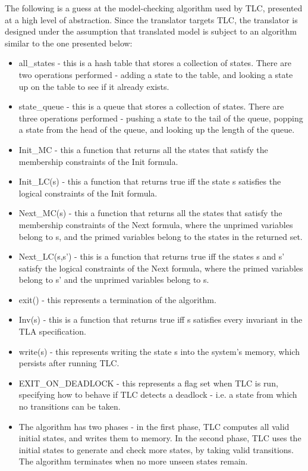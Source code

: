 

The following is a guess at the model-checking algorithm used by TLC, presented at a high level of abstraction. Since the translator targets TLC, the translator is designed under the assumption that translated model is subject to an algorithm similar to the one presented below:

\begin{itemize}
  \item all\_states - this is a hash table that stores a collection of states. There are two operations performed - adding a state to the table, and looking a state up on the table to see if it already exists.
  \item state\_queue - this is a queue that stores a collection of states. There are three operations performed - pushing a state to the tail of the queue, popping a state from the head of the queue, and looking up the length of the queue.
  \item Init\_MC - this a function that returns all the states that satisfy the membership constraints of the Init formula.
  \item Init\_LC(s) - this a function that returns true iff the state s satisfies the logical constraints of the Init formula.
  \item Next\_MC(s) - this a function that returns all the states that satisfy the membership constraints of the Next formula, where the unprimed variables belong to s, and the primed variables belong to the states in the returned set.
  \item Next\_LC(s,s') - this is a function that returns true iff the states s and s' satisfy the logical constraints of the Next formula, where the primed variables belong to s' and the unprimed variables belong to s.
  \item exit() - this represents a termination of the algorithm.
  \item Inv(s) - this is a function that returns true iff s satisfies every invariant in the TLA specification.
  \item write(s) - this represents writing the state s into the system's memory, which persists after running TLC.
  \item EXIT\_ON\_DEADLOCK - this represents a flag set when TLC is run, specifying how to behave if TLC detects a deadlock - i.e. a state from which no transitions can be taken.
  \item

The algorithm has two phases - in the first phase, TLC computes all valid initial states, and writes them to memory. In the second phase, TLC uses the initial states to generate and check more states, by taking valid transitions. The algorithm terminates when no more unseen states remain.


\end{itemize}


